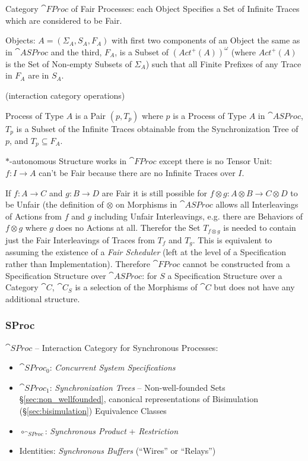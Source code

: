 
Category $\cat{FProc}$ of Fair Processes: each Object Specifies a Set
of Infinite Traces which are considered to be Fair.

Objects: $A = (\Sigma_A,S_A,F_A)$ with first two components of an
Object the same as in $\cat{ASProc}$ and the third, $F_A$, is a Subset
of $(Act^+(A))^\omega$ (where $Act^+(A)$ is the Set of Non-empty
Subsets of $\Sigma_A$) such that all Finite Prefixes of any Trace in
$F_A$ are in $S_A$.

(interaction category operations) %

Process of Type $A$ is a Pair $(p,T_p)$ where $p$ is a Process of Type
$A$ in $\cat{ASProc}$, $T_p$ is a Subset of the Infinite Traces
obtainable from the Synchronization Tree of $p$, and $T_p \subseteq
F_A$.

$*$-autonomous Structure works in $\cat{FProc}$ except there is no
Tensor Unit: $f : I \rightarrow A$ can't be Fair because there are no
Infinite Traces over $I$.

If $f : A \rightarrow C$ and $g : B \rightarrow D$ are Fair it is
still possible for $f \otimes g : A \otimes B \rightarrow C \otimes D$
to be Unfair (the definition of $\otimes$ on Morphisms in
$\cat{ASProc}$ allows all Interleavings of Actions from $f$ and $g$
including Unfair Interleavings, e.g. there are Behaviors of $f \otimes
g$ where $g$ does no Actions at all. Therefor the Set $T_{f \otimes
  g}$ is needed to contain just the Fair Interleavings of Traces from
$T_f$ and $T_g$. This is equivalent to assuming the existence of a
\emph{Fair Scheduler} (left at the level of a Specification rather
than Implementation). Therefore $\cat{FProc}$ cannot be constructed
from a Specification Structure over $\cat{ASProc}$: for $S$ a
Specification Structure over a Category $\cat{C}$, $\cat{C}_S$ is a
selection of the Morphisms of $\cat{C}$ but does not have any
additional structure. %



\subsubsection{SProc}\label{sec:sproc}

$\cat{SProc}$ -- Interaction Category for Synchronous Processes:
\begin{itemize}
  \item $\cat{SProc}_0$: \emph{Concurrent System Specifications}
  \item $\cat{SProc}_1$: \emph{Synchronization Trees} --
    Non-well-founded Sets \S\ref{sec:non_wellfounded}, canonical
    representations of Bisimulation (\S\ref{sec:bisimulation})
    Equivalence Classes
  \item $\circ_{\cat{SProc}}$: \emph{Synchronous Product} +
    \emph{Restriction}
  \item Identities: \emph{Synchronous Buffers} (``Wires'' or
    ``Relays'')
\end{itemize}

